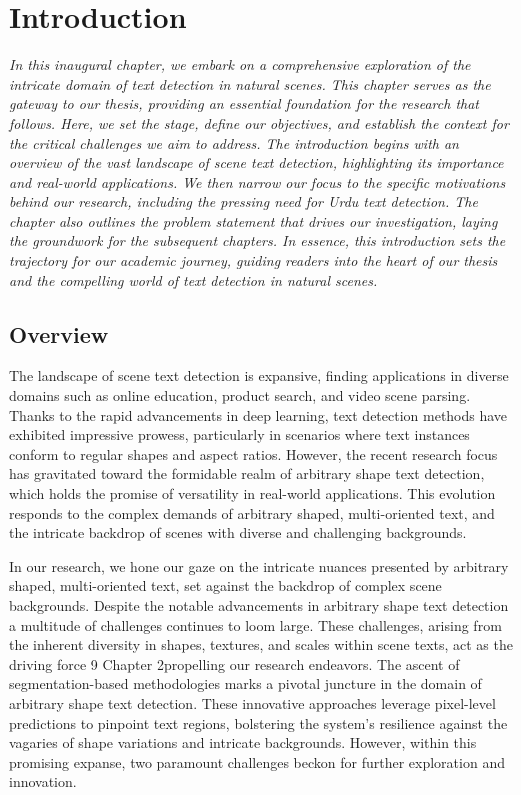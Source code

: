 \setlength{\footskip}{8mm}

\chapter{Introduction} 

\textit{In this inaugural chapter, we embark on a comprehensive exploration of the intricate domain of text detection in natural scenes. This chapter serves as the gateway to our thesis, providing an essential foundation for the research that follows. Here, we set the stage, define our objectives, and establish the context for the critical challenges we aim to address. The introduction begins with an overview of the vast landscape of scene text detection, highlighting its importance and real-world applications. We then narrow our focus to the specific motivations behind our research, including the pressing need for Urdu text detection. The chapter also outlines the problem statement that drives our investigation, laying the groundwork for the subsequent chapters. In essence, this introduction sets the trajectory for our academic journey, guiding readers into the heart of our thesis and the compelling world of text detection in natural scenes.}

\section{Overview}

The landscape of scene text detection is expansive, finding applications in diverse domains such as online education, product search, and video scene parsing. Thanks to the rapid advancements in deep learning, text detection methods have exhibited impressive prowess, particularly in scenarios where text instances conform to regular shapes and aspect ratios. However, the recent research focus has gravitated toward the formidable realm of arbitrary shape text detection, which holds the promise of versatility in real-world applications. This evolution responds to the complex demands of arbitrary shaped, multi-oriented text, and the intricate backdrop of scenes with diverse and challenging backgrounds.

In our research, we hone our gaze on the intricate nuances presented by arbitrary shaped, multi-oriented text, set against the backdrop of complex scene backgrounds. Despite the notable advancements in arbitrary shape text detection a multitude of challenges continues to loom large. These challenges, arising from the inherent diversity in shapes, textures, and scales within scene texts, act as the driving force 
9
Chapter 2propelling our research endeavors. The ascent of segmentation-based methodologies marks a pivotal juncture in the domain of arbitrary shape text detection. These innovative approaches leverage pixel-level predictions to pinpoint text regions, bolstering the system's resilience against the vagaries of shape variations and intricate backgrounds. However, within this promising expanse, two paramount challenges beckon for further exploration and innovation.

